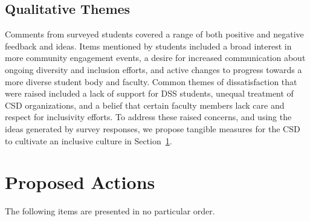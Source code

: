 \documentclass{article}
\begin{document}
\subsection{Qualitative Themes}
Comments from surveyed students covered a range of both positive and negative feedback and ideas. 
Items mentioned by students included
a broad interest in more community engagement events, a desire for increased communication about 
ongoing diversity and inclusion efforts, and active changes to progress towards a more 
diverse student body and faculty. Common themes of dissatisfaction that
were raised included a lack of support for DSS students, unequal treatment 
of CSD organizations, and a belief that certain faculty members lack care and respect
for inclusivity efforts. To address these raised concerns, and using the ideas generated by survey responses,
we propose tangible measures for the CSD to cultivate an inclusive culture in Section~\ref{proposed actions}.

\section{Proposed Actions}\label{proposed actions}
The following items are presented in no particular order.
\end{document}
